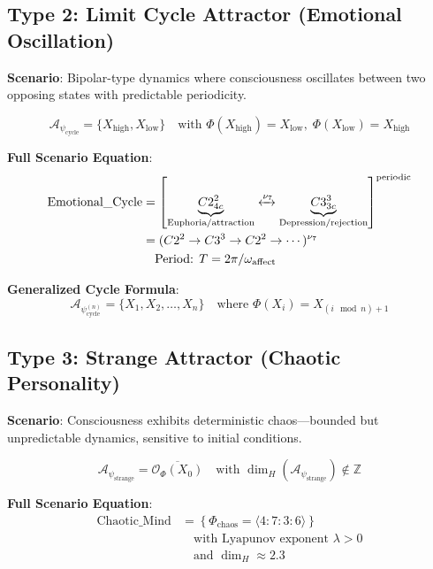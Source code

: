 \documentclass[11pt,twoside]{book}
\newcommand{\noe}[1]{\nu_{#1}}
\newcommand{\Frac}{\Phi}
\newcommand{\HausdorffDim}{\dim_H}
\newcommand{\PsychAttractor}{\mathcal{A}_\psi}
\begin{document}
\subsection{Type 2: Limit Cycle Attractor (Emotional Oscillation)}

\textbf{Scenario}: Bipolar-type dynamics where consciousness oscillates between two
opposing states with predictable periodicity.

\begin{equation}
\boxed{
    \PsychAttractor_{\mathrm{cycle}} = \{X_{\mathrm{high}}, X_{\mathrm{low}}\}
    \quad \text{with } \Frac(X_{\mathrm{high}}) = X_{\mathrm{low}}, \;
    \Frac(X_{\mathrm{low}}) = X_{\mathrm{high}}
}
\end{equation}

\textbf{Full Scenario Equation}:
\begin{align}
    \text{Emotional\_Cycle} &= \left[
    \underbrace{C2^2_{4c}}_{\text{Euphoria/attraction}}
    \xleftrightarrow{\noe{7}}
    \underbrace{C3^3_{3c}}_{\text{Depression/rejection}}
    \right]^{\mathrm{periodic}} \\
    &= (C2^2 \to C3^3 \to C2^2 \to \cdots)^{\noe{7}} \\
    &\quad \text{Period: } T = 2\pi / \omega_{\mathrm{affect}}
\end{align}

\textbf{Generalized Cycle Formula}:
\begin{equation}
    \PsychAttractor_{\mathrm{cycle}}^{(n)} = \{X_1, X_2, \ldots, X_n\}
    \quad \text{where } \Frac(X_i) = X_{(i \mod n) + 1}
\end{equation}

\subsection{Type 3: Strange Attractor (Chaotic Personality)}

\textbf{Scenario}: Consciousness exhibits deterministic chaos---bounded but unpredictable
dynamics, sensitive to initial conditions.

\begin{equation}
\boxed{
    \PsychAttractor_{\mathrm{strange}} = \overline{\mathcal{O}_\Frac(X_0)}
    \quad \text{with } \HausdorffDim(\PsychAttractor_{\mathrm{strange}}) \notin \mathbb{Z}
}
\end{equation}

\textbf{Full Scenario Equation}:
\begin{align}
    \text{Chaotic\_Mind} &= \left\{
    \Frac_{\mathrm{chaos}} = \langle 4 : 7 : 3 : 6 \rangle
    \right\} \nonumber \\
    &\quad \text{with Lyapunov exponent } \lambda > 0 \\
    &\quad \text{and } \HausdorffDim \approx 2.3
\end{align}
\end{document}
